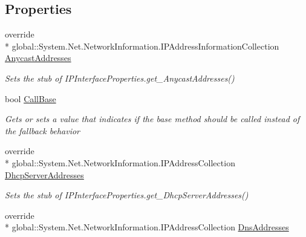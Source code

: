 \subsection*{Properties}
\begin{DoxyCompactItemize}
\item 
override \\*
global\-::\-System.\-Net.\-Network\-Information.\-I\-P\-Address\-Information\-Collection \hyperlink{class_system_1_1_net_1_1_network_information_1_1_fakes_1_1_stub_i_p_interface_properties_acd2a9a7f3c28493b979ec61e5061eeed}{Anycast\-Addresses}
\begin{DoxyCompactList}\small\item\em Sets the stub of I\-P\-Interface\-Properties.\-get\-\_\-\-Anycast\-Addresses()\end{DoxyCompactList}\item 
bool \hyperlink{class_system_1_1_net_1_1_network_information_1_1_fakes_1_1_stub_i_p_interface_properties_a1dd9ca8840d2cdda7cdb46ec68566a51}{Call\-Base}
\begin{DoxyCompactList}\small\item\em Gets or sets a value that indicates if the base method should be called instead of the fallback behavior\end{DoxyCompactList}\item 
override \\*
global\-::\-System.\-Net.\-Network\-Information.\-I\-P\-Address\-Collection \hyperlink{class_system_1_1_net_1_1_network_information_1_1_fakes_1_1_stub_i_p_interface_properties_a8738880519e8302091d8016cb5fac4e8}{Dhcp\-Server\-Addresses}
\begin{DoxyCompactList}\small\item\em Sets the stub of I\-P\-Interface\-Properties.\-get\-\_\-\-Dhcp\-Server\-Addresses()\end{DoxyCompactList}\item 
override \\*
global\-::\-System.\-Net.\-Network\-Information.\-I\-P\-Address\-Collection \hyperlink{class_system_1_1_net_1_1_network_information_1_1_fakes_1_1_stub_i_p_interface_properties_a334e676848990ebf125fc5e9c65de0d0}{Dns\-Addresses}

\end{DoxyCompactItemize}
